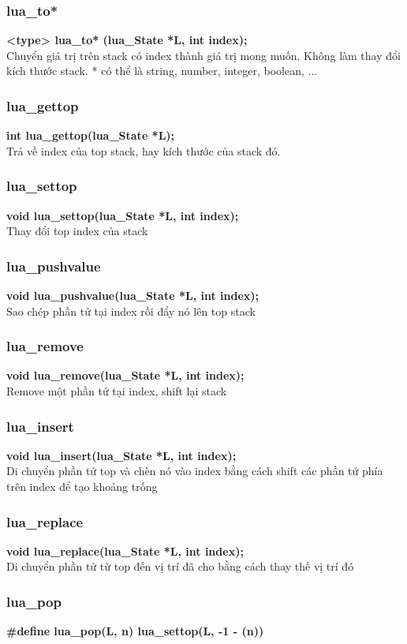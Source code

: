 \documentclass[12pt]{article}
\begin{document}
\subsubsection{lua\_to*}
\textbf{<type> lua\_to* (lua\_State *L, int index);} \\
Chuyển giá trị trên stack có index thành giá trị mong muốn. Không làm thay đổi kích thước stack. * có thể là string, number, integer, boolean, ...
\subsubsection{lua\_gettop}
\textbf{int lua\_gettop(lua\_State *L);} \\
Trả về index của top stack, hay kích thước của stack đó.
\subsubsection{lua\_settop}
\textbf{void lua\_settop(lua\_State *L, int index);} \\
Thay đổi top index của stack 
\subsubsection{lua\_pushvalue}
\textbf{void lua\_pushvalue(lua\_State *L, int index);} \\
Sao chép phần tử tại index rồi đẩy nó lên top stack
\subsubsection{lua\_remove}
\textbf{void lua\_remove(lua\_State *L, int index);} \\
Remove một phần tử tại index, shift lại stack
\subsubsection{lua\_insert}
\textbf{void lua\_insert(lua\_State *L, int index);} \\
Di chuyển phần tử top và chèn nó vào index bằng cách shift các phần tử phía trên index để tạo khoảng trống	
\subsubsection{lua\_replace}
\textbf{void lua\_replace(lua\_State *L, int index);} \\
Di chuyển phần tử từ top đến vị trí đã cho bằng cách thay thế vị trí đó
\subsubsection{lua\_pop} 
\textbf{\#define lua\_pop(L, n) lua\_settop(L, -1 - (n))}
\end{document}
